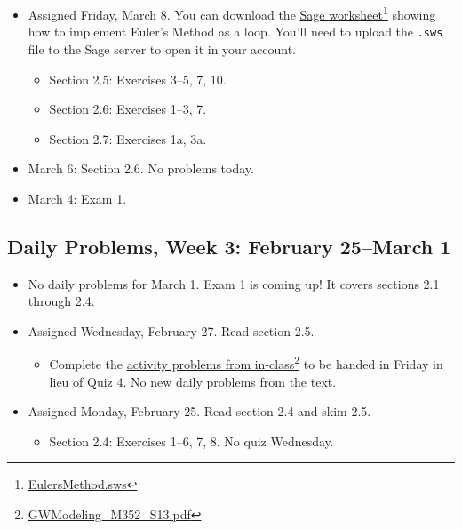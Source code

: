 \begin{itemize}
\item Assigned Friday, March 8. You can download the \href{EulersMethod.sws}{Sage worksheet}\footnote{\href{EulersMethod.sws}{EulersMethod.sws}} showing how to implement Euler's Method as a loop. You'll need to upload the \texttt{.sws} file to the Sage server to open it in your account.

\begin{itemize}
\item Section 2.5: Exercises 3--5, 7, 10.

\item Section 2.6: Exercises 1--3, 7.

\item Section 2.7: Exercises 1a, 3a.

\end{itemize}

\item March 6: Section 2.6. No problems today.

\item March 4: Exam 1.

\end{itemize}

\subsection{Daily Problems, Week 3: February 25--March 1}
\label{dailyproblemsweek3:february25--march1}

\begin{itemize}
\item No daily problems for March 1. Exam 1 is coming up! It covers sections 2.1 through 2.4.

\item Assigned Wednesday, February 27. Read section 2.5.

\begin{itemize}
\item Complete the \href{GWModeling_M352_S13.pdf}{activity problems from in-class}\footnote{\href{GWModeling_M352_S13.pdf}{GWModeling\_M352\_S13.pdf}} to be handed in Friday in lieu of Quiz 4. No new daily problems from the text.

\end{itemize}

\item Assigned Monday, February 25. Read section 2.4 and skim 2.5.

\begin{itemize}
\item Section 2.4: Exercises 1--6, 7, 8. No quiz Wednesday.

\end{itemize}

\end{itemize}

